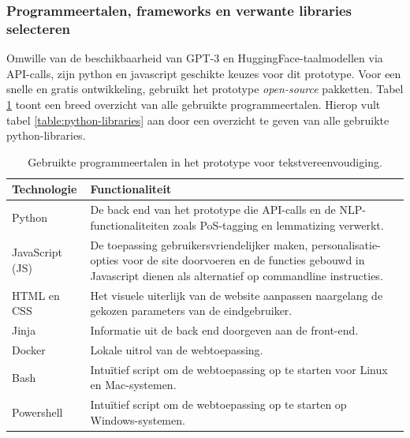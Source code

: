 \subsubsection{Programmeertalen, frameworks en verwante libraries selecteren}

Omwille van de beschikbaarheid van GPT-3 en HuggingFace-taalmodellen via API-calls, zijn python en javascript geschikte keuzes voor dit prototype. Voor een snelle en gratis ontwikkeling, gebruikt het prototype \textit{open-source} pakketten. Tabel \ref{table:technologies} toont een breed overzicht van alle gebruikte programmeertalen. Hierop vult tabel \ref{table:python-libraries} aan door een overzicht te geven van alle gebruikte python-libraries.

\begin{center}
	\begin{table}[H]
	\begin{tabular}{ | m{4cm} | m{11cm} | } 
		\hline
		\textbf{Technologie} 	& \textbf{Functionaliteit} \\
		\hline
		Python 					& De back end van het prototype die API-calls en de NLP-functionaliteiten zoals PoS-tagging en lemmatizing verwerkt. \\
		\hline
		JavaScript (JS)				& De toepassing gebruikersvriendelijker maken, personalisatie-opties voor de site doorvoeren en de functies gebouwd in Javascript dienen als alternatief op commandline instructies. \\
		\hline
		HTML en CSS 			& Het visuele uiterlijk van de website aanpassen naargelang de gekozen parameters van de eindgebruiker. \\
		\hline
		Jinja 					& Informatie uit de back end doorgeven aan de front-end.  \\
		\hline
		Docker 					& Lokale uitrol van de webtoepassing. \\
		\hline
		Bash					& Intuïtief script om de webtoepassing op te starten voor Linux en Mac-systemen. \\
		\hline
		Powershell 				& Intuïtief script om de webtoepassing op te starten op Windows-systemen. \\
		\hline
	\end{tabular}
	\caption{Gebruikte programmeertalen in het prototype voor tekstvereenvoudiging.}
	\label{table:technologies}
	\end{table}
\end{center}

